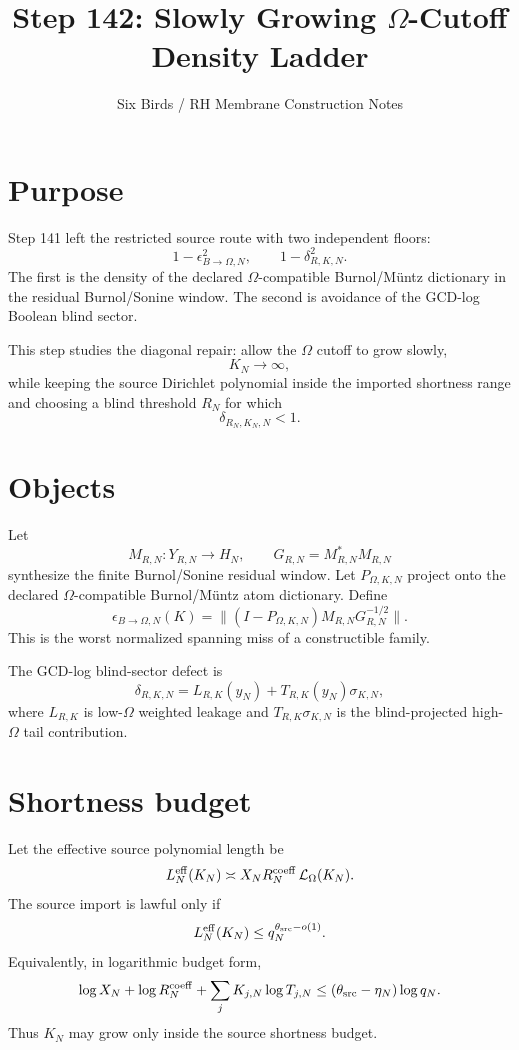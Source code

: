 \documentclass[11pt]{article}
\title{Step 142: Slowly Growing $\Omega$-Cutoff Density Ladder}
\author{Six Birds / RH Membrane Construction Notes}
\date{}
\begin{document}
\maketitle
\section{Purpose}
Step 141 left the restricted source route with two independent floors:
\[
1-\epsilon_{B\to\Omega,N}^2,\qquad 1-\delta_{R,K,N}^2.
\]
The first is the density of the declared $\Omega$-compatible Burnol/M\"untz dictionary in the residual Burnol/Sonine window. The second is avoidance of the GCD-log Boolean blind sector.

This step studies the diagonal repair: allow the $\Omega$ cutoff to grow slowly,
\[
K_N\to\infty,
\]
while keeping the source Dirichlet polynomial inside the imported shortness range and choosing a blind threshold $R_N$ for which
\[
\delta_{R_N,K_N,N}<1.
\]

\section{Objects}
Let
\[
M_{R,N}:Y_{R,N}\to H_N,\qquad G_{R,N}=M_{R,N}^*M_{R,N}
\]
synthesize the finite Burnol/Sonine residual window. Let $P_{\Omega,K,N}$ project onto the declared $\Omega$-compatible Burnol/M\"untz atom dictionary. Define
\[
\epsilon_{B\to\Omega,N}(K)=\|(I-P_{\Omega,K,N})M_{R,N}G_{R,N}^{-1/2}\|.
\]
This is the worst normalized spanning miss of a constructible family.

The GCD-log blind-sector defect is
\[
\delta_{R,K,N}=L_{R,K}(y_N)+T_{R,K}(y_N)\sigma_{K,N},
\]
where $L_{R,K}$ is low-$\Omega$ weighted leakage and $T_{R,K}\sigma_{K,N}$ is the blind-projected high-$\Omega$ tail contribution.

\section{Shortness budget}
Let the effective source polynomial length be
\[
L_N^{\rm eff}(K_N)\asymp X_NR_N^{\rm coeff}\,\mathcal L_\Omega(K_N).
\]
The source import is lawful only if
\[
L_N^{\rm eff}(K_N)\le q_N^{\theta_{\rm src}-o(1)}.
\]
Equivalently, in logarithmic budget form,
\[
\log X_N+\log R_N^{\rm coeff}+\sum_j K_{j,N}\log T_{j,N}\le (\theta_{\rm src}-\eta_N)\log q_N.
\]
Thus $K_N$ may grow only inside the source shortness budget.
\end{document}
